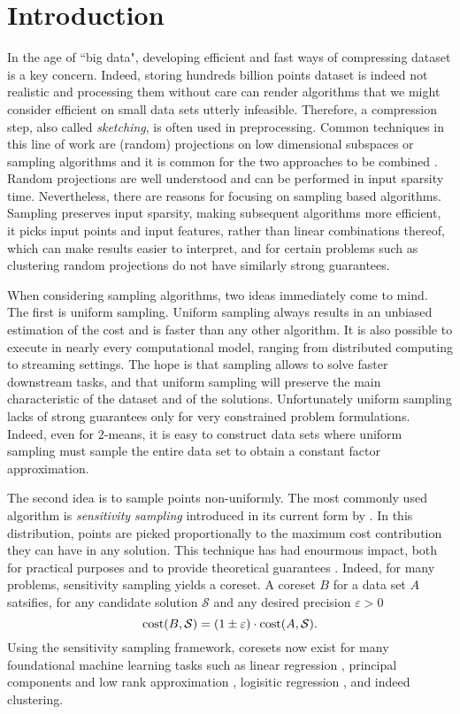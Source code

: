 \section{Introduction}

In the age of ``big data", developing efficient and fast ways of compressing dataset is a key concern. Indeed, storing hundreds billion points dataset is indeed not realistic and processing them without care can render algorithms that we might consider efficient on small data sets utterly infeasible. 
Therefore, a compression step, also called \textit{sketching}, is often used in preprocessing. Common techniques in this line of work are (random) projections on low dimensional subspaces or sampling algorithms and it is common for the two approaches to be combined \cite{MahoneyDMW12} . 
Random projections are well understood and can be performed in input sparsity time.
Nevertheless, there are reasons for focusing on sampling based algorithms. Sampling preserves input sparsity, making subsequent algorithms more efficient, it picks input points and input features, rather than linear combinations thereof, which can make results easier to interpret, and for certain problems such as clustering random projections do not have similarly strong guarantees.

When considering sampling algorithms, two ideas immediately come to mind. The first is uniform sampling. Uniform sampling always results in an unbiased estimation of the cost and is faster than any other algorithm. 
It is also possible to execute in nearly every computational model, ranging from distributed computing to streaming settings.
The hope is that sampling allows to solve faster downstream tasks, and that uniform sampling will preserve the main characteristic of the dataset and of the solutions.
Unfortunately uniform sampling lacks of strong guarantees only for very constrained problem formulations. Indeed, even for $2$-means, it is easy to construct data sets where uniform sampling must sample the entire data set to obtain a constant factor approximation.

The second idea is to sample points non-uniformly. 
The most commonly used algorithm is \textit{sensitivity sampling} introduced in its current form by \cite{LS10}. In this distribution, points are picked proportionally to the maximum cost contribution they can have in any solution. 
This technique has had enourmous impact, both for practical purposes \cite{ref} and to provide theoretical guarantees \cite{FeldmanL11, CohenP15}. Indeed, for many problems, sensitivity sampling yields a coreset. A coreset $B$ for a data set $A$ satsifies, for any candidate solution $\mathcal{S}$ and any desired precision $\varepsilon>0$
$$\operatorname{cost}(B,\mathcal{S}) = (1\pm \varepsilon)\cdot \operatorname{cost}(A,\mathcal{S}).$$
Using the sensitivity sampling framework, coresets now exist for many foundational machine learning tasks such as linear regression \cite{}, principal components and low rank approximation \cite{}, logisitic regression \cite{},  and indeed clustering.

